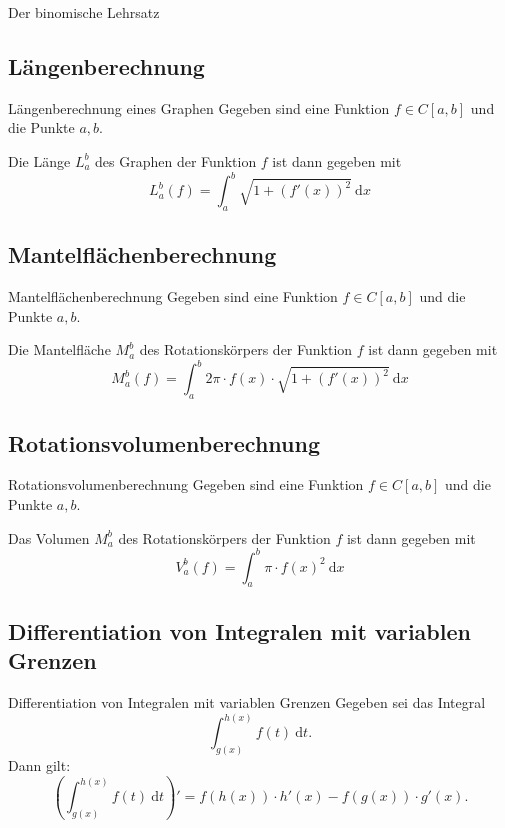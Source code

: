 \documentclass[german]{spicker}
\newcommand{\dx}{~\mathrm{d}x}
\newcommand{\dt}{~\mathrm{d}t}
\begin{document}
\begin{defi}{Der binomische Lehrsatz}
\newpage
\subsection{Längenberechnung}

\begin{algo}{Längenberechnung eines Graphen}
    Gegeben sind eine Funktion $f\in C[a, b]$ und die Punkte $a, b$.

    Die Länge $L_a^b$ des Graphen der Funktion $f$ ist dann gegeben mit
    $$
        L^b_a(f) = \int_a^b \sqrt{1+(f'(x))^2} \dx
    $$
\end{algo}

\subsection{Mantelflächenberechnung}

\begin{algo}{Mantelflächenberechnung}
    Gegeben sind eine Funktion $f\in C[a, b]$ und die Punkte $a, b$.

    Die Mantelfläche $M_a^b$ des Rotationskörpers der Funktion $f$ ist dann gegeben mit
    $$
        M^b_a(f) = \int_a^b 2\pi \cdot f(x) \cdot \sqrt{1+(f'(x))^2} \dx
    $$
\end{algo}

\subsection{Rotationsvolumenberechnung}

\begin{algo}{Rotationsvolumenberechnung}
    Gegeben sind eine Funktion $f\in C[a, b]$ und die Punkte $a, b$.

    Das Volumen $M_a^b$ des Rotationskörpers der Funktion $f$ ist dann gegeben mit
    $$
        V^b_a(f) = \int_a^b \pi \cdot f(x)^2 \dx
    $$
\end{algo}

\subsection{Differentiation von Integralen mit variablen Grenzen}

\begin{algo}{Differentiation von Integralen mit variablen Grenzen}
    Gegeben sei das Integral
    $$
        \int^{h(x)}_{g(x)} f(t)\dt.
    $$
    Dann gilt:
    $$
        \left(\int^{h(x)}_{g(x)} f(t)\dt\right)' = f(h(x)) \cdot h'(x) - f(g(x))\cdot g'(x).
    $$
\end{algo}


\end{defi}
\end{document}
